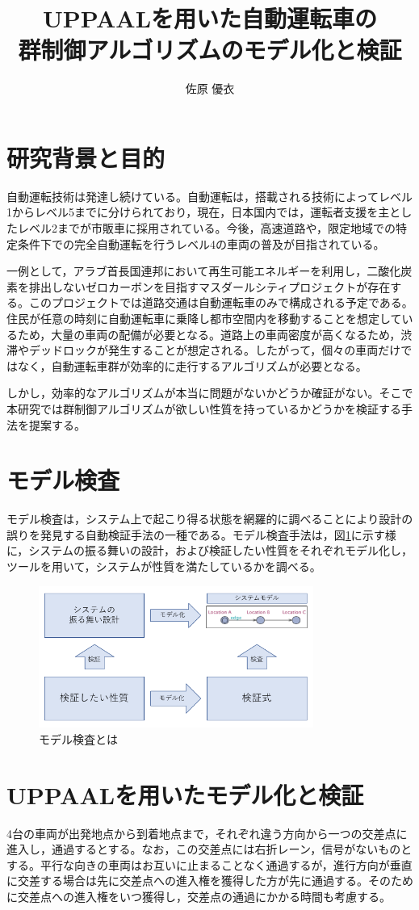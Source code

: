 \documentclass[10pt]{tpu-abst-utf}
\author{佐原 優衣}
\title{UPPAALを用いた自動運転車の\\群制御アルゴリズムのモデル化と検証}
\begin{document}
%
\maketitle
%
%
\section{研究背景と目的}
%
自動運転技術は発達し続けている。自動運転は，搭載される技術によってレベル1からレベル5までに分けられており，現在，日本国内では，運転者支援を主としたレベル2までが市販車に採用されている。今後，高速道路や，限定地域での特定条件下での完全自動運転を行うレベル4の車両の普及が目指されている。
	
一例として，アラブ首長国連邦において再生可能エネルギーを利用し，二酸化炭素を排出しないゼロカーボンを目指すマスダールシティプロジェクトが存在する。このプロジェクトでは道路交通は自動運転車のみで構成される予定である。住民が任意の時刻に自動運転車に乗降し都市空間内を移動することを想定しているため，大量の車両の配備が必要となる。道路上の車両密度が高くなるため，渋滞やデッドロックが発生することが想定される。したがって，個々の車両だけではなく，自動運転車群が効率的に走行するアルゴリズムが必要となる。
	
しかし，効率的なアルゴリズムが本当に問題がないかどうか確証がない。そこで本研究では群制御アルゴリズムが欲しい性質を持っているかどうかを検証する手法を提案する。
%
\section{モデル検査}
モデル検査は，システム上で起こり得る状態を網羅的に調べることにより設計の誤りを発見する自動検証手法の一種である。モデル検査手法は，図\ref{ModelV}に示す様に，システムの振る舞いの設計，および検証したい性質をそれぞれモデル化し，ツールを用いて，システムが性質を満たしているかを調べる。
	\begin{figure}[htbp]
	\centering
	\includegraphics[width=90mm]{ModelVerification.png}
	\caption{モデル検査とは}
	\label{ModelV}
	\end{figure}
\section{UPPAALを用いたモデル化と検証}
4台の車両が出発地点から到着地点まで，それぞれ違う方向から一つの交差点に進入し，通過するとする。なお，この交差点には右折レーン，信号がないものとする。平行な向きの車両はお互いに止まることなく通過するが，進行方向が垂直に交差する場合は先に交差点への進入権を獲得した方が先に通過する。そのために交差点への進入権をいつ獲得し，交差点の通過にかかる時間も考慮する。
\end{document}
